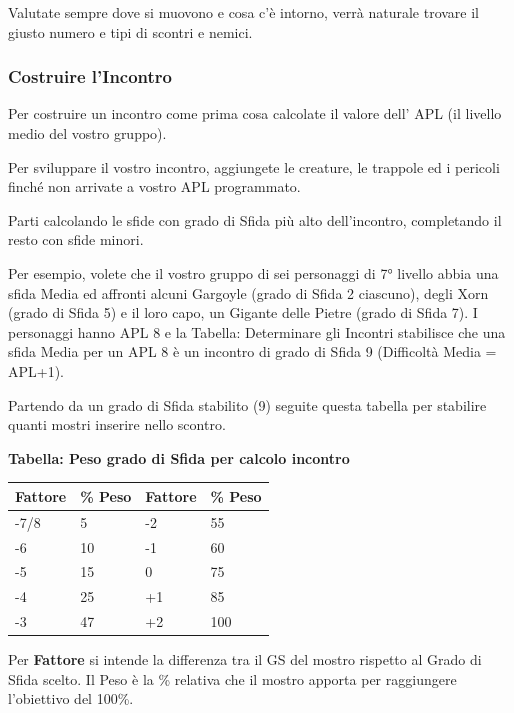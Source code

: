 \begin{multicols}{2}
Valutate sempre dove si muovono e cosa c'è intorno, verrà naturale trovare il giusto numero e tipi di scontri e nemici.

\subsubsection{Costruire l'Incontro}\label{costruireincontro}

Per costruire un incontro come prima cosa calcolate il valore dell' APL (il livello medio del vostro gruppo).

Per sviluppare il vostro incontro, aggiungete le creature, le trappole ed i pericoli finché non arrivate a vostro APL programmato.

Parti calcolando le sfide con grado di Sfida più alto dell'incontro, completando il resto con sfide minori.

Per esempio, volete che il vostro gruppo di sei personaggi di 7° livello abbia una sfida Media ed affronti alcuni Gargoyle (grado di Sfida 2 ciascuno), degli Xorn (grado di Sfida 5) e il loro capo, un Gigante delle Pietre (grado di Sfida 7). I personaggi hanno APL 8 e la Tabella: Determinare gli Incontri stabilisce che una sfida Media per un APL 8 è un incontro di grado di Sfida 9 (Difficoltà Media = APL+1).

Partendo da un grado di Sfida stabilito (9) seguite questa tabella per stabilire quanti mostri inserire nello scontro.

\medskip

\textbf{Tabella: Peso grado di Sfida per calcolo incontro}

\medskip

\noindent\begin{tabular}{l|l||l|l|}
\textbf{Fattore} & \textbf{\% Peso} &\textbf{Fattore} & \textbf{\% Peso}\\
\toprule
-7/8& 5 & -2 & 55\\
-6& 10 & -1 & 60\\
-5& 15 &0 & 75\\
-4& 25 &+1& 85\\
-3& 47 &+2& 100\\
\end{tabular}

\medskip

Per \textbf{Fattore} si intende la differenza tra il GS del mostro rispetto al Grado di Sfida scelto. Il Peso è la \% relativa che il mostro apporta per raggiungere l'obiettivo del 100\%.


\end{multicols}
